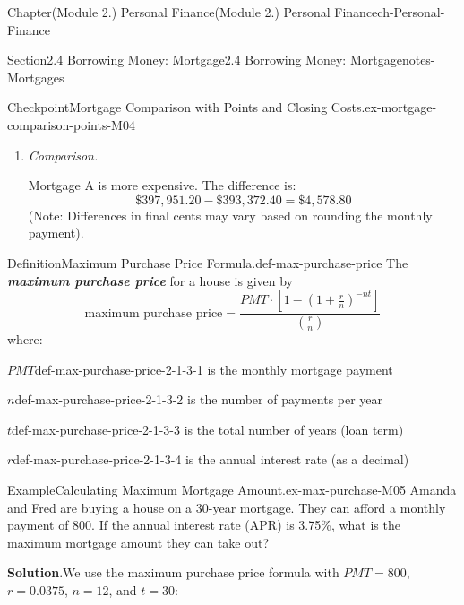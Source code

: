 \documentclass[oneside,10pt,]{book}
\newcommand{\blocktitlefont}{\relax}
\newcommand{\alert}[1]{\textbf{\textit{#1}}}
\newcommand{\lititle}[1]{{\slshape#1}}
\newcommand{\amp}{&}
\begin{document}
\begin{chapterptx}{Chapter}{(Module 2.) Personal Finance}{}{(Module 2.) Personal Finance}{}{}{ch-Personal-Finance}
\begin{sectionptx}{Section}{2.4 Borrowing Money: Mortgage}{}{2.4 Borrowing Money: Mortgage}{}{}{notes-Mortgages}
\begin{inlineexercise}{Checkpoint}{Mortgage Comparison with Points and Closing Costs.}{ex-mortgage-comparison-points-M04}
\begin{enumerate}
\begin{align*}
\text{Total Cost}_B \amp = \$383,222.40 + \$8,400.00 + \$1,750.00 = \$393,372.40
\end{align*}
%
\item{}\lititle{Comparison.}\par%
Mortgage A is more expensive. The difference is:%
\begin{equation*}
\$397,951.20 - \$393,372.40 = \$4,578.80
\end{equation*}
(Note: Differences in final cents may vary based on rounding the monthly payment).%
\end{enumerate}
\end{inlineexercise}%
\begin{definition}{Definition}{Maximum Purchase Price Formula.}{def-max-purchase-price}%
The \alert{maximum purchase price} for a house is given by%
\begin{equation*}
\text{maximum purchase price} = \frac{PMT \cdot \left[1 - \left(1 + \frac{r}{n}\right)^{-nt}\right]}{\left(\frac{r}{n}\right)}
\end{equation*}
where:%
\begin{descriptionlist}
\begin{dlimedium}{\(PMT\)}{def-max-purchase-price-2-1-3-1}%
is the monthly mortgage payment%
\end{dlimedium}%
\begin{dlimedium}{\(n\)}{def-max-purchase-price-2-1-3-2}%
is the number of payments per year%
\end{dlimedium}%
\begin{dlimedium}{\(t\)}{def-max-purchase-price-2-1-3-3}%
is the total number of years (loan term)%
\end{dlimedium}%
\begin{dlimedium}{\(r\)}{def-max-purchase-price-2-1-3-4}%
is the annual interest rate (as a decimal)%
\end{dlimedium}%
\end{descriptionlist}
%
\end{definition}
\begin{example}{Example}{Calculating Maximum Mortgage Amount.}{ex-max-purchase-M05}%
Amanda and Fred are buying a house on a 30-year mortgage. They can afford a monthly payment of \textdollar{}800. If the annual interest rate (APR) is 3.75\%, what is the maximum mortgage amount they can take out?%
\par\smallskip%
\noindent\textbf{\blocktitlefont Solution}.\hypertarget{ex-max-purchase-M05-3}{}\quad{}We use the maximum purchase price formula with \(PMT = 800\), \(r = 0.0375\), \(n = 12\), and \(t = 30\):%

\end{example}
\end{sectionptx}
\end{chapterptx}
\end{document}

